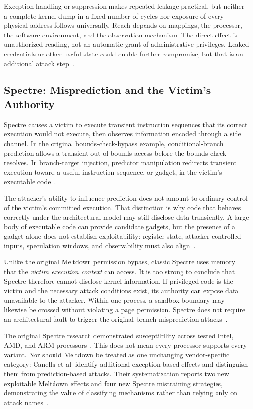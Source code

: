 \documentclass[man,12pt,apacite,nofontenc,nolmodern,floatsintext]{apa6}
\begin{document}
Exception handling or suppression makes repeated leakage practical, but neither a complete kernel dump in a fixed number of cycles nor exposure of every physical address follows universally. Reach depends on mappings, the processor, the software environment, and the observation mechanism. The direct effect is unauthorized reading, not an automatic grant of administrative privileges. Leaked credentials or other useful state could enable further compromise, but that is an additional attack step~\cite{meltdown2018}.

\subsection{Spectre: Misprediction and the Victim's Authority}
Spectre causes a victim to execute transient instruction sequences that its correct execution would not execute, then observes information encoded through a side channel. In the original bounds-check-bypass example, conditional-branch prediction allows a transient out-of-bounds access before the bounds check resolves. In branch-target injection, predictor manipulation redirects transient execution toward a useful instruction sequence, or gadget, in the victim's executable code~\cite{spectre2019}.

The attacker's ability to influence prediction does not amount to ordinary control of the victim's committed execution. That distinction is why code that behaves correctly under the architectural model may still disclose data transiently. A large body of executable code can provide candidate gadgets, but the presence of a gadget alone does not establish exploitability: register state, attacker-controlled inputs, speculation windows, and observability must also align~\cite{spectre2019}.

Unlike the original Meltdown permission bypass, classic Spectre uses memory that the \emph{victim execution context} can access. It is too strong to conclude that Spectre therefore cannot disclose kernel information. If privileged code is the victim and the necessary attack conditions exist, its authority can expose data unavailable to the attacker. Within one process, a sandbox boundary may likewise be crossed without violating a page permission. Spectre does not require an architectural fault to trigger the original branch-misprediction attacks~\cite{canella2019,spectre2019}.

The original Spectre research demonstrated susceptibility across tested Intel, AMD, and ARM processors~\cite{spectre2019}. This does not mean every processor supports every variant. Nor should Meltdown be treated as one unchanging vendor-specific category: Canella et al. identify additional exception-based effects and distinguish them from prediction-based attacks. Their systematization reports two new exploitable Meltdown effects and four new Spectre mistraining strategies, demonstrating the value of classifying mechanisms rather than relying only on attack names~\cite{canella2019}.
\end{document}
